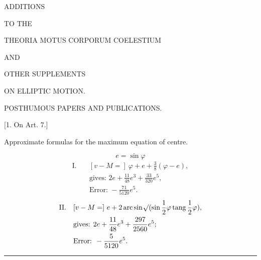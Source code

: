 \clearpage
\thispagestyle{empty}
\vspace*{1.6in}
\begin{center}
{\LARGE ADDITIONS\par}
\bigskip
{\large TO THE\par}
\bigskip
{\large THEORIA MOTUS CORPORUM COELESTIUM\par}
\bigskip
{\large AND\par}
\bigskip
{\Large OTHER SUPPLEMENTS\par}
\medskip
{\large ON ELLIPTIC MOTION.\par}
\end{center}
\clearpage
{}
\begin{center}
{\large POSTHUMOUS PAPERS AND PUBLICATIONS.\par}
\bigskip
{}[1. On Art. 7.]
\medskip

Approximate formulas for the maximum equation of centre.
\end{center}
\[
e=\sin\varphi
\]
\[
\begin{aligned}
\mathrm{I.}\quad &[v-M=]\ \varphi+e+\frac{3}{8}(\varphi-e),\\
&\text{gives: }2e+\frac{11}{48}e^3+\frac{33}{320}e^5,\\
&\text{Error: }-\frac{71}{5120}e^5.
\end{aligned}
\]
\[
\begin{aligned}
\mathrm{II.}\quad &[v-M=]\ e+2\operatorname{arc}\sin\BareRoot{(\sin\frac{1}{2}\varphi\operatorname{tang}\frac{1}{2}\varphi)},\\
&\text{gives: }2e+\frac{11}{48}e^3+\frac{297}{2560}e^5;\\
&\text{Error: }-\frac{5}{5120}e^5.
\end{aligned}
\]
\begin{center}\rule{.3\linewidth}{.4pt}\end{center}
